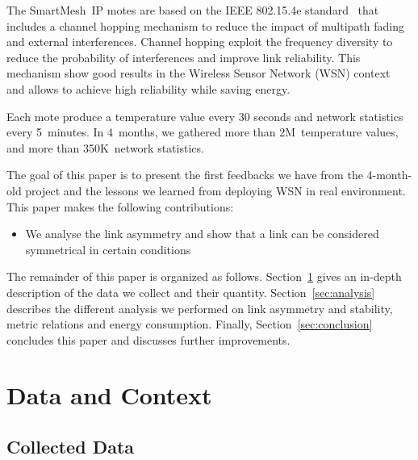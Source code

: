 \documentclass{sig-alternate}
\newcommand{\smip}                  {SmartMesh~IP\xspace}
\begin{document}

The \smip motes are based on the IEEE 802.15.4e standard~\cite{std_ieee802154e} that includes a channel hopping mechanism to reduce the impact of multipath fading and external interferences.
Channel hopping exploit the frequency diversity to reduce the probability of interferences and improve link reliability.
This mechanism show good results in the Wireless Sensor Network (WSN) context~\cite{watteyne2010mitigating, watteyne2009reliability} and allows to achieve high reliability while saving energy.


Each mote produce a temperature value every 30 seconds and network statistics every 5~minutes.
In 4~months, we gathered more than 2M~temperature values, and more than 350K~network statistics.


The goal of this paper is to present the first feedbacks we have from the 4-month-old project and the lessons we learned from deploying WSN in real environment.
This paper makes the following contributions:
\begin{itemize}
    \item{We analyse the link asymmetry and show that a link can be considered symmetrical in certain conditions}
\end{itemize}


The remainder of this paper is organized as follows.
Section~\ref{sec:collected} gives an in-depth description of the data we collect and their quantity.
Section~\ref{sec:analysis} describes the different analysis we performed on link asymmetry and stability, metric relations and energy consumption.
Finally, Section~\ref{sec:conclusion} concludes this paper and discusses further improvements.

\section{Data and Context}
\label{sec:collected}

\subsection{Collected Data}
\end{document}
